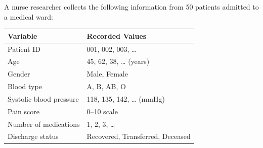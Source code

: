 \documentclass[
  12pt,
  letterpaper,
]{book}
\newcounter{none} %
\begin{document}
A nurse researcher collects the following information from 50 patients
admitted to a medical ward:

{\def\LTcaptype{none} %
\begin{longtable}[]{@{}ll@{}}
\toprule\noalign{}
Variable & Recorded Values \\
\midrule\noalign{}
\endhead
\bottomrule\noalign{}
\endlastfoot
Patient ID & 001, 002, 003, \ldots{} \\
Age & 45, 62, 38, \ldots{} (years) \\
Gender & Male, Female \\
Blood type & A, B, AB, O \\
Systolic blood pressure & 118, 135, 142, \ldots{} (mmHg) \\
Pain score & 0--10 scale \\
Number of medications & 1, 2, 3, \ldots{} \\
Discharge status & Recovered, Transferred, Deceased \\
\end{longtable}
}
\end{document}
